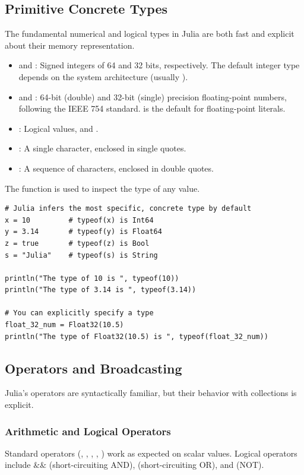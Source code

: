 \subsection*{Primitive Concrete Types}
The fundamental numerical and logical types in Julia are both fast and explicit about their memory representation.
\begin{itemize}
    \item \textbf{} and \textbf{}: Signed integers of 64 and 32 bits, respectively. The default integer type depends on the system architecture (usually ).
    \item \textbf{} and \textbf{}: 64-bit (double) and 32-bit (single) precision floating-point numbers, following the IEEE 754 standard.  is the default for floating-point literals.
    \item \textbf{}: Logical values,  and .
    \item \textbf{}: A single character, enclosed in single quotes.
    \item \textbf{}: A sequence of characters, enclosed in double quotes.
\end{itemize}

\begin{example}
The  function is used to inspect the type of any value.
\text{ }\begin{verbatim}
# Julia infers the most specific, concrete type by default
x = 10         # typeof(x) is Int64
y = 3.14       # typeof(y) is Float64
z = true       # typeof(z) is Bool
s = "Julia"    # typeof(s) is String

println("The type of 10 is ", typeof(10))
println("The type of 3.14 is ", typeof(3.14))

# You can explicitly specify a type
float_32_num = Float32(10.5)
println("The type of Float32(10.5) is ", typeof(float_32_num))
\end{verbatim}
\end{example}

\subsection*{Operators and Broadcasting}
Julia's operators are syntactically familiar, but their behavior with collections is explicit.

\subsubsection*{Arithmetic and Logical Operators}
Standard operators (\jcode{+}, \jcode{-}, \jcode{*}, \jcode{/}, \jcode{^}) work as expected on scalar values. Logical operators include $\&\&$ (short-circuiting AND), \jcode{||} (short-circuiting OR), and \jcode{!} (NOT).

